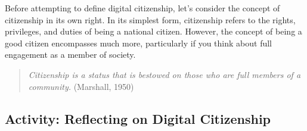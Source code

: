 \documentclass[
  letterpaper,
  DIV=11,
  numbers=noendperiod]{scrreprt}
\begin{document}
Before attempting to define digital citizenship, let's consider the
concept of citizenship in its own right. In its simplest form,
citizenship refers to the rights, privileges, and duties of being a
national citizen. However, the concept of being a good citizen
encompasses much more, particularly if you think about full engagement
as a member of society.

\begin{quote}
\emph{Citizenship is a status that is bestowed on those who are full
members of a community.} (Marshall, 1950)
\end{quote}

\subsection{Activity: Reflecting on Digital
Citizenship}\label{activity-reflecting-on-digital-citizenship}
\end{document}

